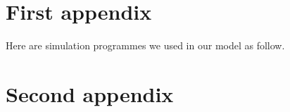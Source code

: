 \documentclass{mcmthesis}
\begin{document}
\begin{appendices}
	
	\section{First appendix}
	
	\lipsum[13]
	
	Here are simulation programmes we used in our model as follow.\\
	
	
	\section{Second appendix}
	
	
	
\end{appendices}
	
	
\end{document}
